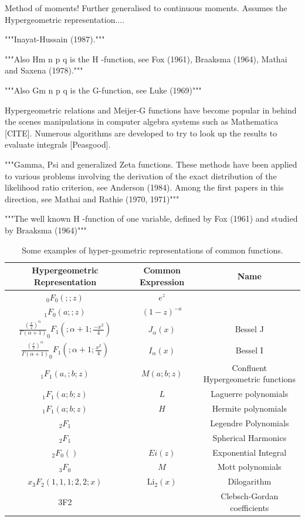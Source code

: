 \documentclass{article}
\begin{document}
Method of moments!
Further generalised to continuous moments. 
Assumes the Hypergeometric representation.... 


"""Inayat-Hussain
(1987)."""

"""Also Hm n
p q is the H -function, see Fox (1961), Braaksma (1964), Mathai and
Saxena (1978)."""

"""Also Gm n
p q is the G-function, see Luke (1969)"""


Hypergeometric relations and Meijer-G functions have become popular in behind the scenes manipulations in computer algebra systems such as Mathematica [CITE]. Numerous algorithms are developed to try to look up the results to evaluate integrals [Peasgood]. \citep{Rathie1997}

"""Gamma, Psi and generalized Zeta functions. These methods have been
applied to various problems involving the derivation of the exact distribution
of the likelihood ratio criterion, see Anderson (1984). Among the first papers
in this direction, see Mathai and Rathie (1970, 1971)""" \citep{Rathie1997}


"""The well known H -function of one variable, defined by Fox (1961) and
studied by Braaksma (1964)""" \citep{Rathie1997}

\begin{table}
\begin{tabular}{|c|c|c|}
\hline
Hypergeometric Representation & Common Expression & Name\\
\hline
$_0F_0(;;z)$&$e^z$ &\\
$_1F_0(a;;z)$ & $(1-z)^{-a}$ &\\
$\frac{(\frac{x}{2})^\alpha}{\Gamma(\alpha+1)} _0F_1(;\alpha+1;\frac{-x^2}{4}) $ & $J_\alpha(x)$ & Bessel J \\
$\frac{(\frac{x}{2})^\alpha}{\Gamma(\alpha+1)} _0F_1(;\alpha+1;\frac{x^2}{4}) $ & $I_\alpha(x)$ & Bessel I \\
$_1F_1(a,;b;z)$ & $M(a;b;z)$ & Confluent Hypergeometric functions \\
$_1F_1(a;b;z)$ & $L$ & Laguerre polynomials \\
$_1F_1(a;b;z)$ & $H$ & Hermite polynomials\\
$_2F_1$ & & Legendre Polynomials\\
$_2F_1$ & & Spherical Harmonics \\
$_2F_0()$ & $Ei(z)$ & Exponential Integral \\
$_3F_0$ & $M$ & Mott polynomials \\
$x_3F_2(1,1,1;2,2;x)$ & $\mathrm{Li}_2(x)$ & Dilogarithm \\
3F2 & & Clebsch-Gordan coefficients \\
\hline
\end{tabular}
\caption{Some examples of hyper-geometric representations of common functions.}
\end{table}
\end{document}
